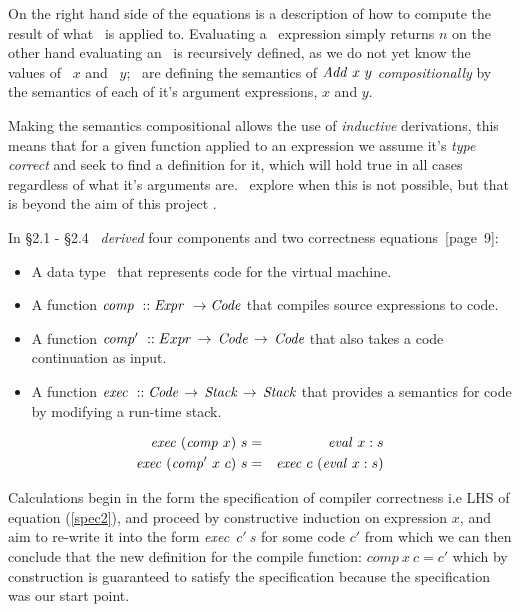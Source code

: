 \documentclass {article}
\begin{document}
On the right hand side of the equations is a
description of how to compute 
the result of what \eval\ is applied to.
Evaluating a \val\ expression simply returns $n$
on the other hand evaluating an \add\
is recursively defined, as we do not yet know
the values of \eval\ $x$ and  \eval\ $y$; \BH\ are defining the
semantics of $\Add x\ y$ \emph{compositionally} by the 
semantics of each of it's argument expressions, $x$ and $y$.

Making the semantics compositional allows
the use of \textit{inductive} derivations,
this means that for a given 
function applied to an expression
we assume it's \textit{type correct} and seek to find
a definition for it, which will hold true in
all cases regardless of what it's arguments are.
\BH\ explore
when this is not possible, but that is beyond
the aim of this project \cite{bandh}.

In \S2.1 - \S2.4 \BH\
\emph{derived} four 
components and two correctness equations\cite{bandh}~[page~9]:
\newcommand{\exec}{\textit{exec}}
\newcommand{\comp }{\textit{comp}}
\newcommand{\compp}{\textit{comp'}}
\newcommand{\Exec}{\mathit{exec\ }}
\newcommand{\Comp}{\mathit{comp\ }}
\newcommand{\Compp}{\mathit{comp'\  }}
\begin{itemize}
\item A data type \code\ that represents
	code for the virtual machine.
\item A function \( \Comp :: \Expr \rightarrow \code \)
	that compiles source expressions to code.
\item A function 
	\( \Compp::Expr \, \rightarrow \, \code \, \rightarrow \, \code \)
	that also takes a code continuation as input.
\item A function
	\( \Exec :: \code \, \rightarrow \, \textit{Stack} \, \rightarrow \, \textit{Stack} \)
	that provides a semantics for code by modifying a run-time stack.
\end{itemize}
\begin{eqnarray}
\Exec  (\Comp   x)\  s &=& \evalf x:s \label{spec1}\\
\Exec  (\Compp  x\  c)\ s &=& \Exec  c\  (\evalf x:s) \label{spec2}
\end{eqnarray}

Calculations begin in the form the 
specification of compiler correctness i.e LHS of equation (\ref{spec2}),
and proceed by constructive induction on expression $x$, 
and aim to re-write it into the form
\exec\  $c'\  s$ for some code $c'$
from which we can then conclude that the new definition
for the compile function: \( \Comp  x\  c = c' \) 
which by construction is guaranteed to satisfy
 the specification because 
the specification was our start point.
\end{document}
